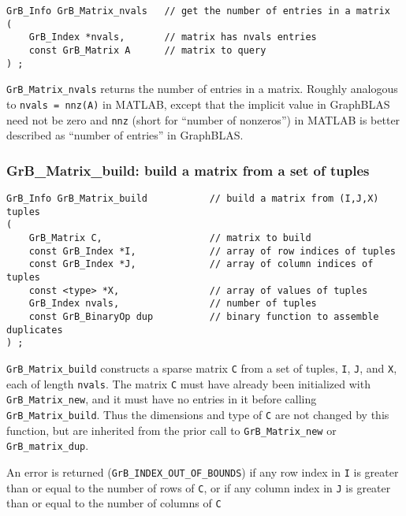 \documentclass[12pt]{article}
\begin{document}
\begin{mdframed}[userdefinedwidth=6in]
{\footnotesize
\begin{verbatim}
GrB_Info GrB_Matrix_nvals   // get the number of entries in a matrix
(
    GrB_Index *nvals,       // matrix has nvals entries
    const GrB_Matrix A      // matrix to query
) ;
\end{verbatim} } \end{mdframed}

\verb'GrB_Matrix_nvals' returns the number of entries in a matrix.  Roughly
analogous to \verb'nvals = nnz(A)' in MATLAB, except that the implicit value in
GraphBLAS need not be zero and \verb'nnz' (short for ``number of nonzeros'') in
MATLAB is better described as ``number of entries'' in GraphBLAS.

\newpage
\subsubsection{{\sf GrB\_Matrix\_build:} build a matrix from a set of tuples}
\label{matrix_build}

\begin{mdframed}[userdefinedwidth=6in]
{\footnotesize
\begin{verbatim}
GrB_Info GrB_Matrix_build           // build a matrix from (I,J,X) tuples
(
    GrB_Matrix C,                   // matrix to build
    const GrB_Index *I,             // array of row indices of tuples
    const GrB_Index *J,             // array of column indices of tuples
    const <type> *X,                // array of values of tuples
    GrB_Index nvals,                // number of tuples
    const GrB_BinaryOp dup          // binary function to assemble duplicates
) ;
\end{verbatim} } \end{mdframed}

\verb'GrB_Matrix_build' constructs a sparse matrix \verb'C' from a set of
tuples, \verb'I', \verb'J', and \verb'X', each of length \verb'nvals'.  The
matrix \verb'C' must have already been initialized with \verb'GrB_Matrix_new',
and it must have no entries in it before calling \verb'GrB_Matrix_build'.  Thus
the dimensions and type of \verb'C' are not changed by this function, but are
inherited from the prior call to \verb'GrB_Matrix_new' or
\verb'GrB_matrix_dup'.

An error is returned (\verb'GrB_INDEX_OUT_OF_BOUNDS') if any row index in
\verb'I' is greater than or equal to the number of rows of \verb'C', or if any
column index in \verb'J' is greater than or equal to the number of columns of
\verb'C'
\end{document}
